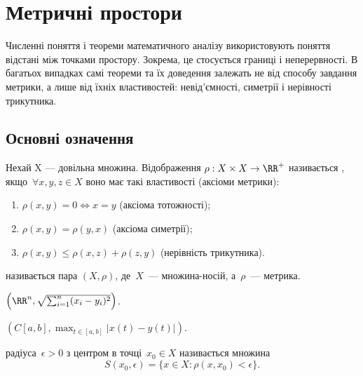 \chapter{Метричні простори}

Численні поняття і теореми математичного аналізу
використовують поняття відстані між точками простору.
Зокрема, це стосується границі і неперервності. В багатьох
випадках самі теореми та їх доведення залежать не від
способу завдання метрики, а лише від їхніх властивостей:
невід’ємності, симетрії і нерівності трикутника.

\section{Основні означення}

\begin{definition}
Нехай X — довільна множина. Відображення
$\rho: X \times X \to \RR^+$ називається , якщо~$\forall x, y, z \in X$
воно має такі властивості (аксіоми метрики):
\begin{enumerate}
    \item $\rho(x, y) = 0 \iff x = y$ (аксіома тотожності);
    \item $\rho(x, y) = \rho(y, x)$ (аксіома симетрії);
    \item $\rho(x, y) \le \rho(x, z) + \rho(z, y)$ (нерівність трикутника).
\end{enumerate}
\end{definition}

\begin{definition}
 називається пара
$(X, \rho)$, де~$X$~--- множи\-на-носій, а~$\rho$~--- метрика.
\end{definition}

\begin{example}
$\left( \RR^n, \sqrt{\sum_{i = 1}^n (x_i - y_i)^2} \right)$.
\end{example}

\begin{example}
$\left( C[a, b], \max_{t \in [a, b]} |x(t) - y(t)| \right)$.
\end{example}

\begin{definition}
 радіуса~$\epsilon > 0$ з центром в
точці~$x_0 \in X$ називається множина
\begin{equation*}
    S(x_0, \epsilon) = \{x \in X: \rho(x, x_0) < \epsilon \}.
\end{equation*}
\end{definition}

